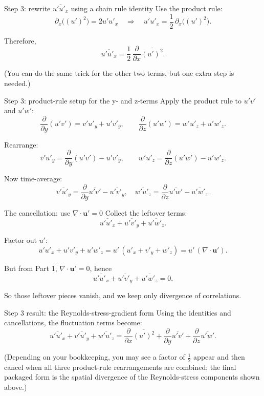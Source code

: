 \documentclass[aspectratio=169]{beamer}
\newcommand{\uu}{\bm{u}}
\newcommand{\avg}[1]{\overline{#1}}
\newcommand{\up}{\uu'}
\newcommand{\Div}{\nabla\cdot}
\begin{document}
\begin{frame}{Step 3: rewrite $\avg{u' u'_x}$ using a chain rule identity}
Use the product rule:
\[
\partial_x\big((u')^2\big)=2u'u'_x
\quad\Rightarrow\quad
u'u'_x=\frac12\,\partial_x\big((u')^2\big).
\]

Therefore,
\[
\avg{u'u'_x}
=
\frac12\,\frac{\partial}{\partial x}\avg{(u')^2}.
\]

(You can do the same trick for the other two terms, but one extra step is needed.)
\end{frame}

\begin{frame}{Step 3: product-rule setup for the y- and z-terms}
Apply the product rule to $u'v'$ and $u'w'$:
\[
\frac{\partial}{\partial y}(u'v') = v' u'_y + u' v'_y,
\qquad
\frac{\partial}{\partial z}(u'w') = w' u'_z + u' w'_z.
\]

Rearrange:
\[
v' u'_y = \frac{\partial}{\partial y}(u'v') - u' v'_y,
\qquad
w' u'_z = \frac{\partial}{\partial z}(u'w') - u' w'_z.
\]

Now time-average:
\[
\avg{v'u'_y} = \frac{\partial}{\partial y}\avg{u'v'} - \avg{u'v'_y},\quad
\avg{w'u'_z} = \frac{\partial}{\partial z}\avg{u'w'} - \avg{u'w'_z}.
\]
\end{frame}

\begin{frame}{The cancellation: use $\Div \up = 0$}
Collect the leftover terms:
\[
\avg{u'u'_x}+\avg{u'v'_y}+\avg{u'w'_z}.
\]

Factor out $u'$:
\[
u'u'_x + u'v'_y + u'w'_z
=
u'\,(u'_x+v'_y+w'_z)
=
u'\,(\Div\up).
\]

But from Part 1, $\Div\up=0$, hence
\[
\avg{u'u'_x}+\avg{u'v'_y}+\avg{u'w'_z}=0.
\]

So those leftover pieces vanish, and we keep only divergence of correlations.
\end{frame}

\begin{frame}{Step 3 result: the Reynolds-stress-gradient form}
Using the identities and cancellations, the fluctuation terms become:
\[
\avg{u' u'_x}+\avg{v' u'_y}+\avg{w' u'_z}
=
\frac{\partial}{\partial x}\avg{(u')^2}
+\frac{\partial}{\partial y}\avg{u'v'}
+\frac{\partial}{\partial z}\avg{u'w'}.
\]

(Depending on your bookkeeping, you may see a factor of $\tfrac12$ appear and then cancel
when all three product-rule rearrangements are combined; the final packaged form is the spatial
divergence of the Reynolds-stress components shown above.)
\end{frame}
\end{document}
